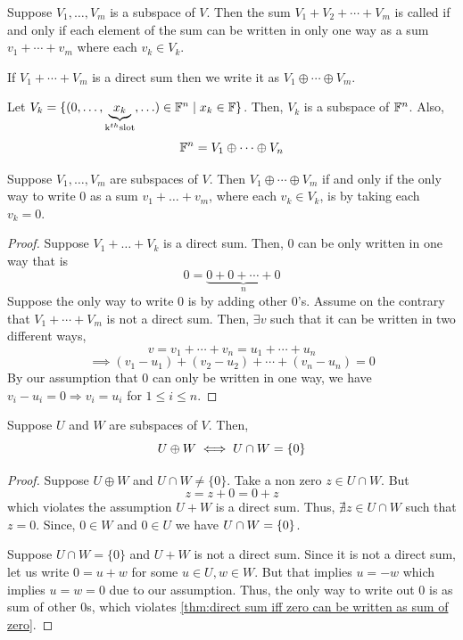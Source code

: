 \begin{definition}
    Suppose $V_1,\ldots,V_m$ is a subspace of $V$. Then the sum $V_1+V_2+\cdots+V_m$ is called  if and only if 
    each element of the sum can be written in only one way as a sum $v_1+\cdots+v_m$ where each $v_k \in V_k$. 
\end{definition}

\begin{notation}
    If $V_1+\cdots+V_m$ is a direct sum then we write it as $V_1 \oplus \cdots \oplus V_m$. 
\end{notation}

\begin{example}
    Let $V_k = \{(0,\ldots,\underbrace{x_k}_{\text{k}^{th} \text{slot}},\ldots) \in \mathbb{F}^n \mid x_k \in \mathbb{F}\}$. Then, $V_k$ is a subspace
    of $\mathbb{F}^n$. Also,
    \[ \mathbb{F}^n = V_1 \oplus \cdots \oplus V_n \]
\end{example}

\begin{theorem}
    \label{thm:direct sum iff zero can be written as sum of zero}
    Suppose $V_1,\ldots,V_m$ are subspaces of $V$. Then $V_1 \oplus \cdots \oplus V_m$ if and only if the only way to write $0$ as a sum 
    $v_1+\ldots+v_m$, where each $v_k \in V_k$, is by taking each $v_k=0$.
\end{theorem}

\begin{proof}
    Suppose $V_1 + \ldots + V_k$ is a direct sum. Then, $0$ can be only written in one way that is
    \[ 0 = \underbrace{0+0+\cdots+0}_{n} \]
    Suppose  the only way to write $0$ is by adding other $0$'s. Assume on the contrary that $V_1 + \cdots + V_m$ is not a direct sum.
    Then, $\exists v$ such that it can be written in two different ways,
    \[ v= v_1 + \cdots + v_n = u_1 + \cdots + u_n \]
    \[ \implies (v_1-u_1)+(v_2-u_2)+ \cdots + (v_n-u_n)=0 \]
    By our assumption that $0$ can only be written in one way, we have $v_i-u_i=0 \Rightarrow v_i = u_i$ for $1 \le i \le n$.
\end{proof}

\begin{theorem}
    \label{thm: direct sum iff intersection is zero}
    Suppose $U$ and $W$ are subspaces of $V$. Then, 
    \[ U \oplus W \iff U \cap W = \{0\} \]
\end{theorem}

\begin{proof}
    Suppose $U \oplus W$ and $U \cap W \neq \{0\}$. Take a non zero $z \in U \cap W$. But 
    \[ z = z + 0 = 0 + z \]
    which violates the assumption $U + W$ is a direct sum. Thus, $\nexists z \in U \cap W$ such that $z = 0$.
    Since, $0 \in W$ and $0 \in U$ we have $U \cap W = \{0\}$.

    Suppose $U \cap W = \{0\}$ and $U + W$ is not a direct sum. Since it is not a direct sum, let us write
    $0 = u+w$ for some $u \in U,w \in W$. But that implies $u=-w$ which implies $u=w=0$ due to our assumption.
    Thus, the only way to write out $0$ is as sum of other $0$s, which violates \cref{thm:direct sum iff zero can be written as sum of zero}.
\end{proof}

